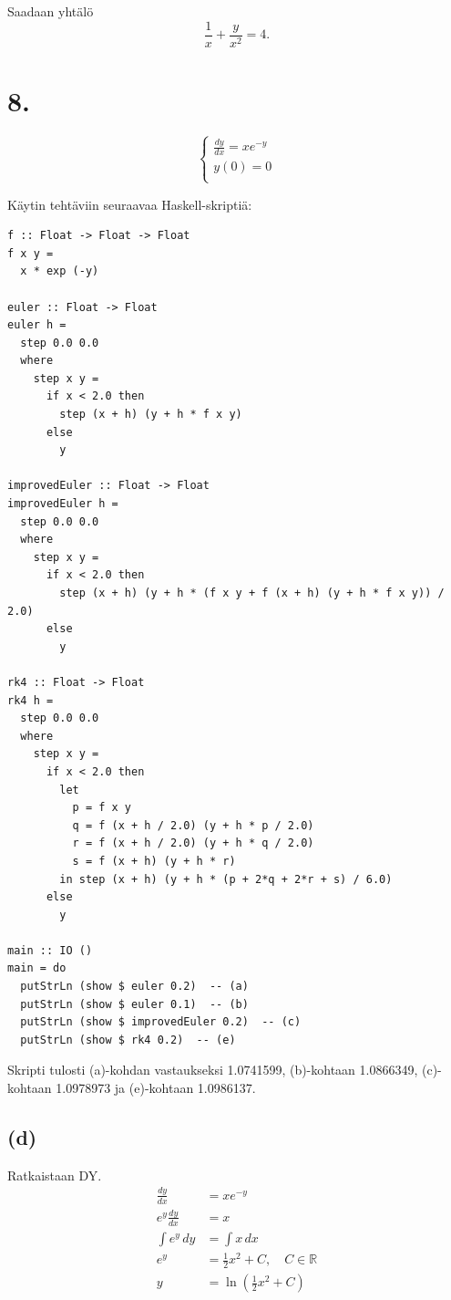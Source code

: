 \documentclass{article}
\begin{document}
Saadaan yhtälö
\[
  \frac{1}{x} + \frac{y}{x^2} = 4.
\]

\section*{8.}

\[
  \begin{cases}
    \frac{dy}{dx} = xe^{-y} \\
    y(0) = 0 \\
  \end{cases}
\]

Käytin tehtäviin seuraavaa Haskell-skriptiä:
\begin{verbatim}
f :: Float -> Float -> Float
f x y =
  x * exp (-y)

euler :: Float -> Float
euler h =
  step 0.0 0.0
  where
    step x y =
      if x < 2.0 then
        step (x + h) (y + h * f x y)
      else
        y

improvedEuler :: Float -> Float
improvedEuler h =
  step 0.0 0.0
  where
    step x y =
      if x < 2.0 then
        step (x + h) (y + h * (f x y + f (x + h) (y + h * f x y)) / 2.0)
      else
        y

rk4 :: Float -> Float
rk4 h =
  step 0.0 0.0
  where
    step x y =
      if x < 2.0 then
        let
          p = f x y
          q = f (x + h / 2.0) (y + h * p / 2.0)
          r = f (x + h / 2.0) (y + h * q / 2.0)
          s = f (x + h) (y + h * r)
        in step (x + h) (y + h * (p + 2*q + 2*r + s) / 6.0)
      else
        y

main :: IO ()
main = do
  putStrLn (show $ euler 0.2)  -- (a)
  putStrLn (show $ euler 0.1)  -- (b)
  putStrLn (show $ improvedEuler 0.2)  -- (c)
  putStrLn (show $ rk4 0.2)  -- (e)
\end{verbatim}

Skripti tulosti (a)-kohdan vastaukseksi 1.0741599,
(b)-kohtaan 1.0866349, (c)-kohtaan 1.0978973 ja (e)-kohtaan 1.0986137.

\subsection*{(d)}

Ratkaistaan DY.
\begin{align*}
  \frac{dy}{dx} &= xe^{-y} \\
  e^y\frac{dy}{dx} &= x \\
  \int e^y\,dy &= \int x\,dx \\
  e^y &= \frac{1}{2}x^2 + C, \quad C \in \mathbb{R} \\
  y &= \ln (\frac{1}{2}x^2 + C) \\
\end{align*}
\end{document}
